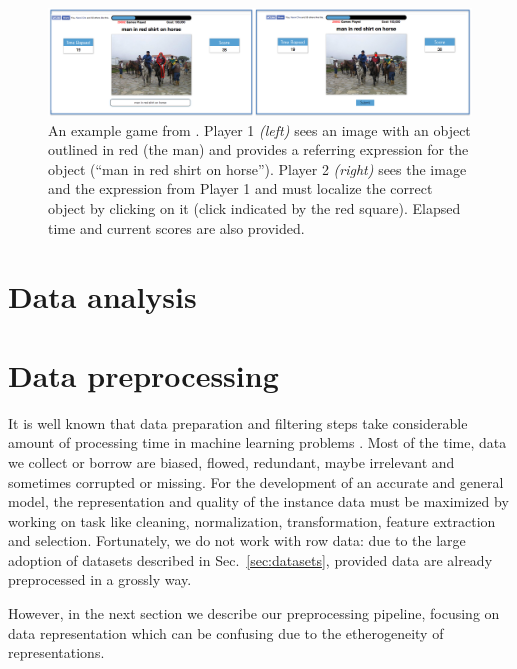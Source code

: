\begin{figure}
  \includegraphics[width=\textwidth]{figures/referitgame-example.png}
  \caption[ReferIt Game Example.]{An example game from . Player 1 \textit{(left)} sees an image with an object
  outlined in red (the man) and provides a referring expression for
  the object (``man in red shirt on horse''). Player 2
  \textit{(right)} sees the image and the expression from Player 1 and
  must localize the correct object by clicking on it (click indicated
  by the red square). Elapsed time and current scores are also
  provided.}
  \label{fig:referitgame-example}
\end{figure}


\section{Data analysis}


\section{Data preprocessing}

It is well known that data preparation and filtering steps take
considerable amount of processing time in machine learning problems
\cite{kotsiantis2006data}. Most of the time, data we collect or borrow
are biased, flowed, redundant, maybe irrelevant and sometimes
corrupted or missing. For the development of an accurate and general
model, the representation and quality of the instance data must be
maximized by working on task like cleaning, normalization,
transformation, feature extraction and selection. Fortunately, we do
not work with row data: due to the large adoption of datasets
described in Sec.~\ref{sec:datasets}, provided data are already
preprocessed in a grossly way.

However, in the next section we describe our preprocessing pipeline,
focusing on data representation which can be confusing due to the
etherogeneity of representations.

